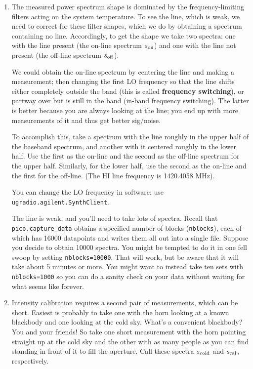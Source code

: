 \documentclass[12pt,preprint]{aastex}
\begin{document}
\begin{enumerate}

\item 
The measured power spectrum shape is dominated by the
frequency-limiting filters acting on the system temperature. To see the
line, which is weak, we need to correct for these filter shapes, which
we do by obtaining a spectrum containing no line. Accordingly, to get
the shape we take two spectra: one with the line present (the on-line
spectrum $s_{\rm on}$) and one with the line not present (the off-line
spectrum $s_{\rm off}$).

We could obtain the on-line
  spectrum by centering the line and making a measurement; then changing
  the first LO frequency so that the line shifts either completely
  outside the band (this is called {\bf frequency switching}), or partway
  over but is still in the band (in-band frequency
  switching). The latter is better because you are always looking at
  the line; you end up with more measurements of it and thus get better sig/noise.

To accomplish this, take a spectrum with the line roughly in the upper
half of the baseband spectrum, and another with it centered roughly in
the lower half. Use the first as the on-line and the second as the
off-line spectrum for the upper half. Similarly, for the lower half,
use the second as the on-line and the first for the off-line.  (The HI
line frequency is 1420.4058 MHz).

You can change the LO frequency in software: use {\tt ugradio.agilent.SynthClient}. 

The line is weak, and you'll need to take lots of spectra. Recall that
{\tt pico.capture\_data} obtains a specified number of blocks ({\tt nblocks}),
each of which has 16000 datapoints and writes them all out into a single
file. Suppose you decide to obtain 10000 spectra. You might be tempted
to do it in one fell swoop by setting {\tt nblocks=10000}. That
will work, but be aware that it will take about 5 minutes or more. You
might want to instead take ten sets with {\tt nblocks=1000} so you can do a
sanity check on your data without waiting for what seems like forever. 

\item Intensity calibration requires a second pair of measurements,
  which can be short. Easiest is probably to take one with the horn
  looking at a known blackbody and one looking at the cold sky. What's a
  convenient blackbody? You and your friends! So take one short
  measurement with the horn pointing straight up at the cold sky and the
  other with as many people as you can find standing in front of it to
  fill the aperture. Call these spectra
  $s_{\rm cold}$ and $s_{\rm cal}$, respectively.

\end{enumerate}
\end{document}
